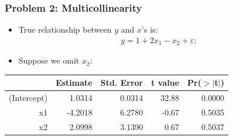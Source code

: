 \documentclass[aspectratio=169]{beamer}
\theoremstyle{principle}
\begin{document}
\begin{frame}
\frametitle{Problem 2: Multicollinearity}

\begin{itemize}
\item True relationship between $y$ and $x$'s is:
\begin{align*}
y = 1 + 2x_1 - x_2 + \varepsilon;
\end{align*}
\item[]\color{white} Suppose we omit $x_2$:
\end{itemize}

\begin{table}[ht]
\centering
\begin{tabular}{rrrrr}
  \hline
\hline
 & Estimate & Std. Error & t value & Pr($>$$|$t$|$) \\ 
  \hline
\hline
(Intercept) & 1.0314 & 0.0314 & 32.88 & 0.0000 \\ 
  x1 & -4.2018 & 6.2780 & -0.67 & 0.5035 \\ 
  x2 & 2.0998 & 3.1390 & 0.67 & 0.5037 \\ 
   \hline
\hline
\end{tabular}
\end{table}
\end{frame}
\end{document}
